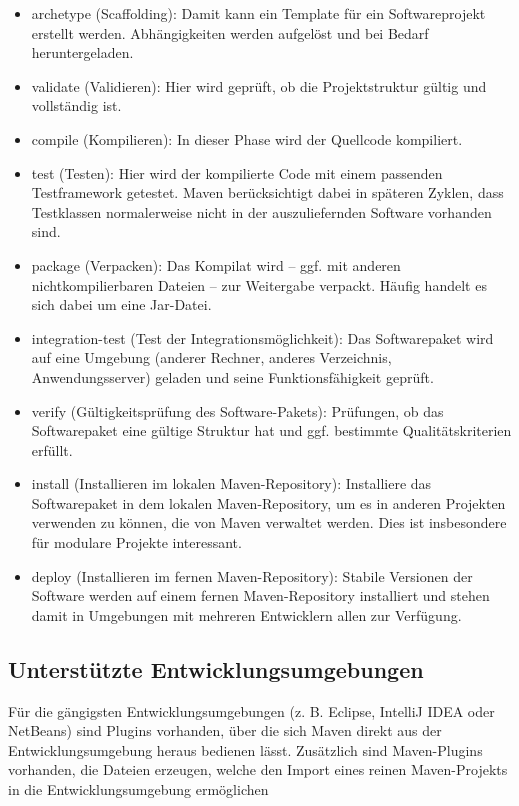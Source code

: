 \begin{itemize}
\item archetype (Scaffolding): Damit kann ein Template für ein Softwareprojekt erstellt werden. Abhängigkeiten werden aufgelöst und bei Bedarf heruntergeladen.
\item validate (Validieren): Hier wird geprüft, ob die Projektstruktur gültig und vollständig ist.
\item compile (Kompilieren): In dieser Phase wird der Quellcode kompiliert.
\item test (Testen): Hier wird der kompilierte Code mit einem passenden Testframework getestet. Maven berücksichtigt dabei in späteren Zyklen, dass Testklassen normalerweise nicht in der auszuliefernden Software vorhanden sind.
\item package (Verpacken): Das Kompilat wird – ggf. mit anderen nichtkompilierbaren Dateien – zur Weitergabe verpackt. Häufig handelt es sich dabei um eine Jar-Datei.
\item integration-test (Test der Integrationsmöglichkeit): Das Softwarepaket wird auf eine Umgebung (anderer Rechner, anderes Verzeichnis, Anwendungsserver) geladen und seine Funktionsfähigkeit geprüft.
\item verify (Gültigkeitsprüfung des Software-Pakets): Prüfungen, ob das Softwarepaket eine gültige Struktur hat und ggf. bestimmte Qualitätskriterien erfüllt.
\item install (Installieren im lokalen Maven-Repository): Installiere das Softwarepaket in dem lokalen Maven-Repository, um es in anderen Projekten verwenden zu können, die von Maven verwaltet werden. Dies ist insbesondere für modulare Projekte interessant.
\item deploy (Installieren im fernen Maven-Repository): Stabile Versionen der Software werden auf einem fernen Maven-Repository installiert und stehen damit in Umgebungen mit mehreren Entwicklern allen zur Verfügung.
\end{itemize}


\subsection{Unterstützte Entwicklungsumgebungen}
Für die gängigsten Entwicklungsumgebungen (z. B. Eclipse, IntelliJ IDEA oder NetBeans) sind Plugins vorhanden, über die sich Maven direkt aus der Entwicklungsumgebung heraus bedienen lässt. Zusätzlich sind Maven-Plugins vorhanden, die Dateien erzeugen, welche den Import eines reinen Maven-Projekts in die Entwicklungsumgebung ermöglichen 

